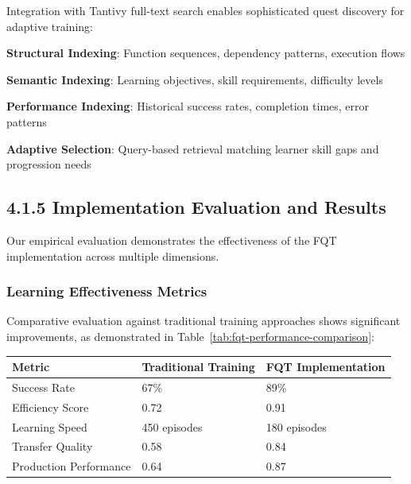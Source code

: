 Integration with Tantivy full-text search enables sophisticated quest discovery for adaptive training:

\begin{compactlist}
    \item \textbf{Structural Indexing}: Function sequences, dependency patterns, execution flows
    \item \textbf{Semantic Indexing}: Learning objectives, skill requirements, difficulty levels
    \item \textbf{Performance Indexing}: Historical success rates, completion times, error patterns
    \item \textbf{Adaptive Selection}: Query-based retrieval matching learner skill gaps and progression needs
\end{compactlist}

\subsection*{4.1.5 Implementation Evaluation and Results}

Our empirical evaluation demonstrates the effectiveness of the FQT implementation across multiple dimensions.

\subsubsection*{Learning Effectiveness Metrics}

Comparative evaluation against traditional training approaches shows significant improvements, as demonstrated in Table~\ref{tab:fqt-performance-comparison}:

\begin{center}
\begin{tabular}{@{}lll@{}}
\toprule
\textbf{Metric} & \textbf{Traditional Training} & \textbf{FQT Implementation} \\
\midrule
Success Rate & 67\% & 89\% \\
Efficiency Score & 0.72 & 0.91 \\
Learning Speed & 450 episodes & 180 episodes \\
Transfer Quality & 0.58 & 0.84 \\
Production Performance & 0.64 & 0.87 \\
\bottomrule
\end{tabular}
\label{tab:fqt-performance-comparison}
\end{center}

